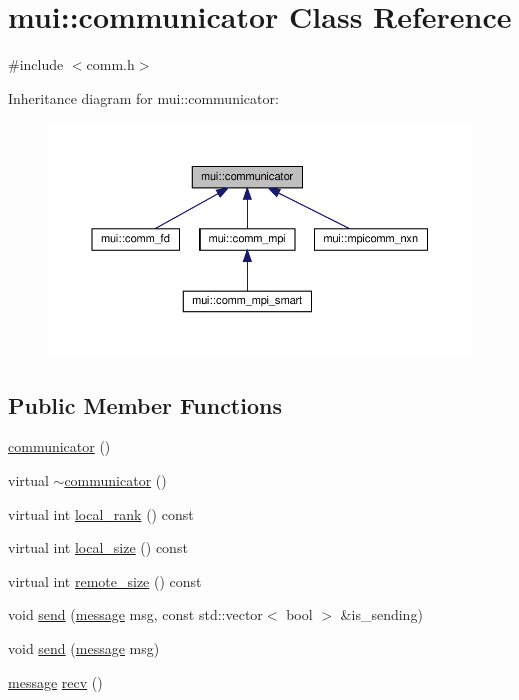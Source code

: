 \hypertarget{classmui_1_1communicator}{}\section{mui\+:\+:communicator Class Reference}
\label{classmui_1_1communicator}


{\ttfamily \#include $<$comm.\+h$>$}



Inheritance diagram for mui\+:\+:communicator\+:
\nopagebreak
\begin{figure}[H]
\begin{center}
\leavevmode
\includegraphics[width=350pt]{classmui_1_1communicator__inherit__graph}
\end{center}
\end{figure}
\subsection*{Public Member Functions}
\begin{DoxyCompactItemize}
\item 
\hyperlink{classmui_1_1communicator_a115082ed8993d41bb492e985041e86e4}{communicator} ()
\item 
virtual \hyperlink{classmui_1_1communicator_aa7f8c2ace12e778f7f710a3058953c44}{$\sim$communicator} ()
\item 
virtual int \hyperlink{classmui_1_1communicator_a83311811022225d758dd86866e620466}{local\+\_\+rank} () const
\item 
virtual int \hyperlink{classmui_1_1communicator_aa98faead0a9f63b8edb8b987477998e1}{local\+\_\+size} () const
\item 
virtual int \hyperlink{classmui_1_1communicator_a8683d36801b78685ce5a58da2c6a6195}{remote\+\_\+size} () const
\item 
void \hyperlink{classmui_1_1communicator_ae81f0d5aedaad66cad99ff0d8258e72c}{send} (\hyperlink{structmui_1_1message}{message} msg, const std\+::vector$<$ bool $>$ \&is\+\_\+sending)
\item 
void \hyperlink{classmui_1_1communicator_ae6e96be2a9ef6ebbd1ead1add1921181}{send} (\hyperlink{structmui_1_1message}{message} msg)
\item 
\hyperlink{structmui_1_1message}{message} \hyperlink{classmui_1_1communicator_a1c2f180ccf56e7121333ccbeb1c70041}{recv} ()
\end{DoxyCompactItemize}
